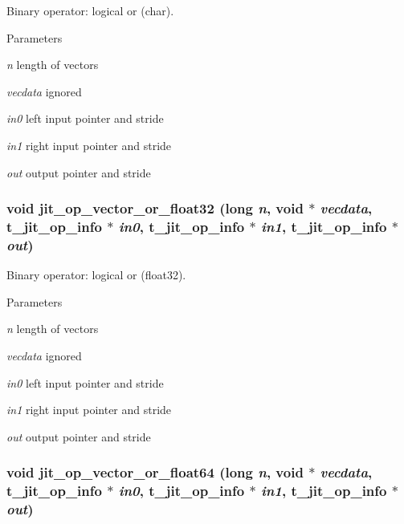 Binary operator: logical or (char). 
\begin{DoxyParams}{Parameters}
\item[{\em n}]length of vectors \item[{\em vecdata}]ignored \item[{\em in0}]left input pointer and stride \item[{\em in1}]right input pointer and stride \item[{\em out}]output pointer and stride \end{DoxyParams}
\hypertarget{group__opvecmod_gaf1653680f6b5692db0b89d90871b54cc}{
\subsubsection[{jit\_\-op\_\-vector\_\-or\_\-float32}]{\setlength{\rightskip}{0pt plus 5cm}void jit\_\-op\_\-vector\_\-or\_\-float32 (long {\em n}, \/  void $\ast$ {\em vecdata}, \/  {\bf t\_\-jit\_\-op\_\-info} $\ast$ {\em in0}, \/  {\bf t\_\-jit\_\-op\_\-info} $\ast$ {\em in1}, \/  {\bf t\_\-jit\_\-op\_\-info} $\ast$ {\em out})}}
\label{group__opvecmod_gaf1653680f6b5692db0b89d90871b54cc}


Binary operator: logical or (float32). 
\begin{DoxyParams}{Parameters}
\item[{\em n}]length of vectors \item[{\em vecdata}]ignored \item[{\em in0}]left input pointer and stride \item[{\em in1}]right input pointer and stride \item[{\em out}]output pointer and stride \end{DoxyParams}
\hypertarget{group__opvecmod_ga32839a95ee648910de8a951d1f64f5af}{
\subsubsection[{jit\_\-op\_\-vector\_\-or\_\-float64}]{\setlength{\rightskip}{0pt plus 5cm}void jit\_\-op\_\-vector\_\-or\_\-float64 (long {\em n}, \/  void $\ast$ {\em vecdata}, \/  {\bf t\_\-jit\_\-op\_\-info} $\ast$ {\em in0}, \/  {\bf t\_\-jit\_\-op\_\-info} $\ast$ {\em in1}, \/  {\bf t\_\-jit\_\-op\_\-info} $\ast$ {\em out})}}
\label{group__opvecmod_ga32839a95ee648910de8a951d1f64f5af}


